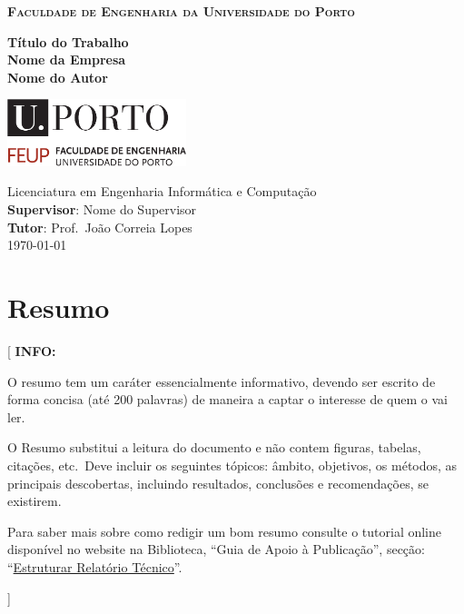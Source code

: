 \documentclass[11pt,a4paper]{report}
\newcommand{\school}{Faculdade de Engenharia da Universidade do Porto}
\newcommand{\degree}{Licenciatura em Engenharia Informática e Computação}
\newcommand{\projtitle}{Título do Trabalho}
\newcommand{\company}{Nome da Empresa}
\newcommand{\projauthor}{Nome do Autor}
\newcommand{\supervisor}{Nome do Supervisor}
\newcommand{\tutor}{Prof.\ João Correia Lopes}
\newenvironment{info}[1]{\vspace*{6mm}\color{blue}[ \textbf{INFO:} \begin{em} #1}
                        {\vspace*{3mm}\end{em} ]}
\begin{document}
\setcounter{page}{1}


\begin{titlepage}
\center

\vspace{-15mm}
{\large \textbf{\textsc{\school}}}\\

\vfill

{\Large \textbf{\projtitle}}\\[8mm]
{\large \textbf{\company}}\\[28mm]

{\Large \textbf{\projauthor}}\\

\vfill

\includegraphics[width=52mm]{uporto-feup.pdf}

\vfill

{\large \degree}\\[8mm]
{\large \textbf{Supervisor}: \supervisor}\\[2mm]
{\large \textbf{Tutor}: \tutor}\\[8mm]

\today

\end{titlepage}


\chapter*{Resumo}

\begin{info}
O resumo tem um caráter essencialmente informativo, devendo ser
escrito de forma concisa (até 200 palavras) de maneira a captar o
interesse de quem o vai ler.

O Resumo substitui a leitura do documento e não contem figuras,
tabelas, citações, etc.\ 
Deve incluir os seguintes tópicos: âmbito, objetivos, os métodos, as
principais descobertas, incluindo resultados, conclusões e
recomendações, se existirem.

Para saber mais sobre como redigir um bom resumo consulte o tutorial
online disponível no website na Biblioteca, ``Guia de Apoio à
Publicação'', secção: 
``\href{https://docs.google.com/document/d/1TDC1behVq8x7fQL4CcPEEh_np5GXviJevQxnQ9gbiJs/edit\#heading=h.s4z9k57ywd9w}
{Estruturar Relatório Técnico}''.
\end{info}
\end{document}
